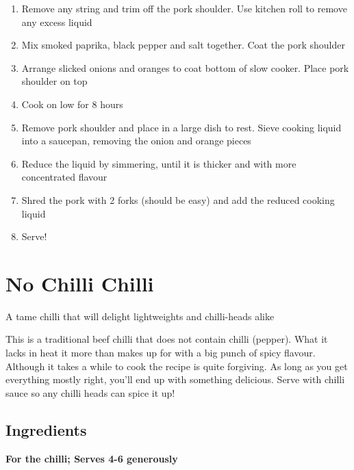 \documentclass[
]{book}
\providecommand{\tightlist}{%
  \setlength{\itemsep}{0pt}\setlength{\parskip}{0pt}}
\begin{document}
\begin{enumerate}
\def\labelenumi{\arabic{enumi}.}
\tightlist
\item
  Remove any string and trim off the pork shoulder. Use kitchen roll to remove any excess liquid
\item
  Mix smoked paprika, black pepper and salt together. Coat the pork shoulder
\item
  Arrange slicked onions and oranges to coat bottom of slow cooker. Place pork shoulder on top
\item
  Cook on low for 8 hours
\item
  Remove pork shoulder and place in a large dish to rest. Sieve cooking liquid into a saucepan, removing the onion and orange pieces
\item
  Reduce the liquid by simmering, until it is thicker and with more concentrated flavour
\item
  Shred the pork with 2 forks (should be easy) and add the reduced cooking liquid
\item
  Serve!
\end{enumerate}

\hypertarget{no-chilli-chilli}{%
\chapter{No Chilli Chilli}\label{no-chilli-chilli}}

A tame chilli that will delight lightweights and chilli-heads alike

This is a traditional beef chilli that does not contain chilli (pepper). What it lacks in heat it more than makes up for with a big punch of spicy flavour. Although it takes a while to cook the recipe is quite forgiving. As long as you get everything mostly right, you'll end up with something delicious. Serve with chilli sauce so any chilli heads can spice it up!

\hypertarget{ingredients-3}{%
\section{Ingredients}\label{ingredients-3}}

\textbf{For the chilli; Serves 4-6 generously}
\end{document}
